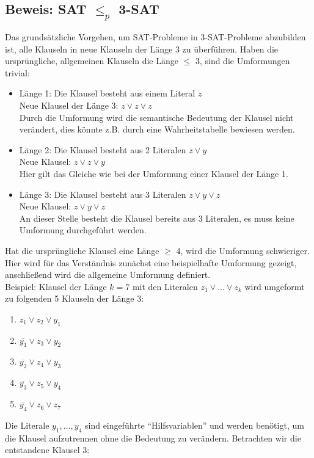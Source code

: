 \documentclass[ngerman]{article}
\begin{document}
\subsection{Beweis: SAT $\le_p$ 3-SAT}
Das grundsätzliche Vorgehen, um SAT-Probleme in 3-SAT-Probleme abzubilden ist, alle Klauseln in neue Klauseln der Länge 3 zu überführen.
Haben die ursprüngliche, allgemeinen Klauseln die Länge $\le$ 3, sind die Umformungen trivial:
\begin{itemize}
\item Länge 1: Die Klausel besteht aus einem Literal $z$\\
Neue Klausel der Länge 3: $z \vee z \vee z$\\
Durch die Umformung wird die semantische Bedeutung der Klausel nicht verändert, dies könnte z.B. durch eine Wahrheitstabelle bewiesen werden.
\item Länge 2: Die Klausel besteht aus 2 Literalen $z \vee y$\\
Neue Klausel: $z \vee z \vee y$\\
Hier gilt das Gleiche wie bei der Umformung einer Klausel der Länge 1.
\item Länge 3: Die Klausel besteht aus 3 Literalen $z \vee y \vee z$\\
Neue Klausel: $z \vee y \vee z$\\
An dieser Stelle besteht die Klausel bereits aus 3 Literalen, es muss keine Umformung durchgeführt werden.
\end{itemize}
Hat die ursprüngliche Klausel eine Länge $\ge$ 4, wird die Umformung schwieriger.
Hier wird für das Verständnis zunächst eine beispielhafte Umformung gezeigt, anschließend wird die allgemeine Umformung definiert.\\
Beispiel: Klausel der Länge $k = 7$ mit den Literalen $z_1 \vee ... \vee z_k$ wird umgeformt zu folgenden 5 Klauseln der Länge 3:
\begin{enumerate}
\item $z_1 \vee z_2 \vee y_1$
\item $\overline{y_1} \vee z_3 \vee y_2$
\item $\overline{y_2} \vee z_4 \vee y_3$
\item $\overline{y_3} \vee z_5 \vee y_4$
\item $\overline{y_4} \vee z_6 \vee z_7$
\end{enumerate}
Die Literale $y_1, ..., y_4$ sind eingeführte ``Hilfsvariablen'' und werden benötigt, um die Klausel aufzutrennen ohne die Bedeutung zu verändern.
Betrachten wir die entstandene Klausel 3:
\end{document}

